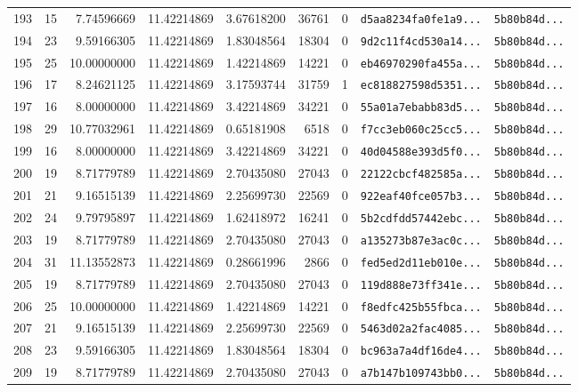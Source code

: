 \documentclass[10pt]{article}
\begin{document}
\begin{longtable}{rrrrrrrll}
  193 & 15 & 7.74596669 & 11.42214869 & 3.67618200 & 36761 & 0 & \texttt{d5aa8234fa0fe1a9...} & \texttt{5b80b84d...} \\
  194 & 23 & 9.59166305 & 11.42214869 & 1.83048564 & 18304 & 0 & \texttt{9d2c11f4cd530a14...} & \texttt{5b80b84d...} \\
  195 & 25 & 10.00000000 & 11.42214869 & 1.42214869 & 14221 & 0 & \texttt{eb46970290fa455a...} & \texttt{5b80b84d...} \\
  \rowcolor{cmpink!20} 196 & 17 & 8.24621125 & 11.42214869 & 3.17593744 & 31759 & 1 & \texttt{ec818827598d5351...} & \texttt{5b80b84d...} \\
  197 & 16 & 8.00000000 & 11.42214869 & 3.42214869 & 34221 & 0 & \texttt{55a01a7ebabb83d5...} & \texttt{5b80b84d...} \\
  198 & 29 & 10.77032961 & 11.42214869 & 0.65181908 & 6518 & 0 & \texttt{f7cc3eb060c25cc5...} & \texttt{5b80b84d...} \\
  199 & 16 & 8.00000000 & 11.42214869 & 3.42214869 & 34221 & 0 & \texttt{40d04588e393d5f0...} & \texttt{5b80b84d...} \\
  200 & 19 & 8.71779789 & 11.42214869 & 2.70435080 & 27043 & 0 & \texttt{22122cbcf482585a...} & \texttt{5b80b84d...} \\
  201 & 21 & 9.16515139 & 11.42214869 & 2.25699730 & 22569 & 0 & \texttt{922eaf40fce057b3...} & \texttt{5b80b84d...} \\
  202 & 24 & 9.79795897 & 11.42214869 & 1.62418972 & 16241 & 0 & \texttt{5b2cdfdd57442ebc...} & \texttt{5b80b84d...} \\
  203 & 19 & 8.71779789 & 11.42214869 & 2.70435080 & 27043 & 0 & \texttt{a135273b87e3ac0c...} & \texttt{5b80b84d...} \\
  204 & 31 & 11.13552873 & 11.42214869 & 0.28661996 & 2866 & 0 & \texttt{fed5ed2d11eb010e...} & \texttt{5b80b84d...} \\
  205 & 19 & 8.71779789 & 11.42214869 & 2.70435080 & 27043 & 0 & \texttt{119d888e73ff341e...} & \texttt{5b80b84d...} \\
  206 & 25 & 10.00000000 & 11.42214869 & 1.42214869 & 14221 & 0 & \texttt{f8edfc425b55fbca...} & \texttt{5b80b84d...} \\
  207 & 21 & 9.16515139 & 11.42214869 & 2.25699730 & 22569 & 0 & \texttt{5463d02a2fac4085...} & \texttt{5b80b84d...} \\
  208 & 23 & 9.59166305 & 11.42214869 & 1.83048564 & 18304 & 0 & \texttt{bc963a7a4df16de4...} & \texttt{5b80b84d...} \\
  209 & 19 & 8.71779789 & 11.42214869 & 2.70435080 & 27043 & 0 & \texttt{a7b147b109743bb0...} & \texttt{5b80b84d...} \\

\end{longtable}
\end{document}
